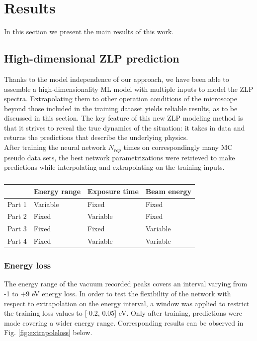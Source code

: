\section{Results}
\label{sec:results}

In this section we present the main results of this work.

\subsection{High-dimensional ZLP prediction}
Thanks to the model independence of our approach, we have been able to assemble a high-dimensionality ML model
with multiple inputs to model the ZLP spectra. Extrapolating them 
to other operation conditions of the microscope beyond those included
in the training dataset yields reliable results, as to be discussed in this section.
The key feature of this new ZLP modeling method is that it strives to reveal the true dynamics of the situation: it takes in data and returns the predictions that describe the underlying physics. \\

After training the neural network $N_{rep}$ times on correspondingly many MC pseudo data sets, the best network parametrizations were retrieved to make predictions while interpolating and extrapolating on the training inputs. 

\begin{table}[H]
\begin{tabular}{|l|l|l|l|}
\centering
\hline
       & Energy range & Exposure time & Beam energy \\ \hline
Part 1 & Variable     & Fixed         & Fixed       \\
Part 2 & Fixed        & Variable      & Fixed       \\
Part 3 & Fixed        & Fixed         & Variable    \\
Part 4 & Fixed        & Variable      & Variable    \\ \hline
\end{tabular}
\caption{}

\end{table}

\subsubsection{Energy loss}

The energy range of the vacuum recorded peaks covers an interval varying from -1 to +9 eV energy loss. In order to test the flexibility of the network with respect to extrapolation on the energy interval, a window was applied to restrict the training loss values to [-0.2, 0.05] eV. Only after training, predictions were made covering a wider energy range. Corresponding results can be observed in Fig. \ref{fig:extrapoleloss} below. 

